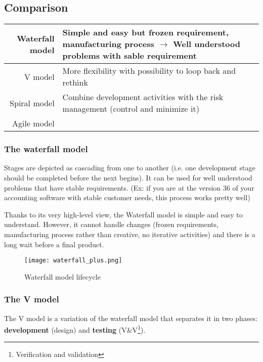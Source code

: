 \subsection{Comparison}

\begin{tabular}{r|p{}}

    Waterfall model & Simple and easy but frozen requirement,
    manufacturing process $\rightarrow$ Well understood problems with sable
    requirement\\
    \hline
    V model & More flexibility with possibility to loop back and rethink  \\
    \hline
    Spiral model & Combine development activities with the risk
    management (control and minimize it)\\
    \hline
    Agile model & \\

\end{tabular}

\subsubsection{The waterfall model} 

Stages are depicted as cascading from one to another (i.e. one
development stage should be completed before the next begins). It can be
used for well understood problems that have stable requirements. (Ex: if
you are at the version 36 of your accounting software with stable
customer needs, this process works pretty well)

Thanks to its very high-level view, the Waterfall model is simple and easy to understand.
However, it cannot handle changes (frozen requirements, manufacturing
process rather than creative, no iterative activities) and there is a
long wait before a final product.

\begin{figure}[!ht]
    \centering
    \texttt{[image: waterfall\_plus.png]}
    \caption{Waterfall model lifecycle}
\end{figure}
\FloatBarrier{}

\subsubsection{The V model}

The V model is a variation of the waterfall model that separates it in
two phases: \textbf{development} (design) and \textbf{testing}
(V\&V\footnote{Verification and validation}).\\

